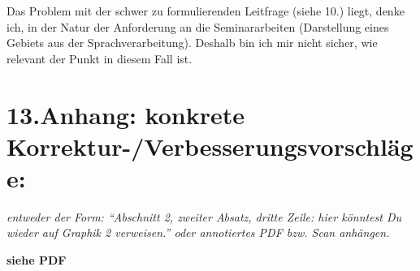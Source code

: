 \documentclass{article}
\begin{document}
\noindent{}  Das Problem mit der schwer zu formulierenden Leitfrage (siehe 10.) liegt, denke ich, in der Natur der Anforderung an die Seminararbeiten (Darstellung eines Gebiets aus der Sprachverarbeitung). Deshalb bin ich mir nicht sicher, wie relevant der Punkt in diesem Fall ist.%

\section{13.\hspace*{0.5em}Anhang: konkrete Korrektur-/Verbesserungsvorschläge:}\label{sec-anhang--konkrete-korrektur-verbesserungsvorschlge-}%

\noindent{}   \emph{entweder der Form: \textquotedblleft{}Abschnitt 2, zweiter Absatz, dritte Zeile:\mdbr
   hier könntest Du wieder auf Graphik 2 verweisen.\textquotedblright{}  oder
   annotiertes PDF bzw. Scan anhängen.}%

   \textbf{siehe PDF}%
\end{document}
